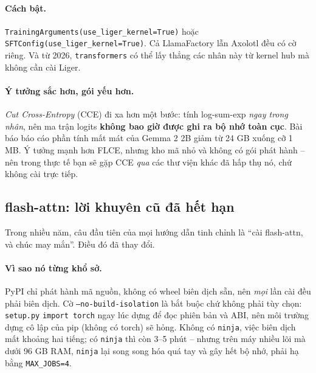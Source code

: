 \paragraph{Cách bật.} \texttt{Training\allowbreak Arguments(\allowbreak use\_\allowbreak liger\_\allowbreak kernel=True)} hoặc \texttt{SFTConfig(\allowbreak use\_\allowbreak liger\_\allowbreak kernel=True)}. Cả LlamaFactory lẫn Axolotl đều có cờ riêng. Và từ 2026, \texttt{transformers} có thể lấy thẳng các nhân này từ kernel hub mà không cần cài Liger.

\paragraph{Ý tưởng sắc hơn, gói yếu hơn.} \emph{Cut Cross-Entropy} (CCE) \cite{wijmans2025cce} đi xa hơn một bước: tính log-sum-exp \emph{ngay trong nhân}, nên ma trận logits \textbf{không bao giờ được ghi ra bộ nhớ toàn cục}. Bài báo báo cáo phần tính mất mát của Gemma 2 2B giảm từ 24 GB xuống cỡ 1 MB. Ý tưởng mạnh hơn FLCE, nhưng kho mã nhỏ và không có gói phát hành -- nên trong thực tế bạn sẽ gặp CCE \emph{qua} các thư viện khác đã hấp thụ nó, chứ không cài trực tiếp.

\subsection{flash-attn: lời khuyên cũ đã hết hạn}
\label{ssec:flashattn_install}

Trong nhiều năm, câu đầu tiên của mọi hướng dẫn tinh chỉnh là “cài flash-attn, và chúc may mắn”. Điều đó đã thay đổi.

\paragraph{Vì sao nó từng khổ sở.} PyPI chỉ phát hành mã nguồn, không có wheel biên dịch sẵn, nên \emph{mọi} lần cài đều phải biên dịch. Cờ \texttt{--no-\allowbreak build-\allowbreak isolation} là bắt buộc chứ không phải tùy chọn: \texttt{setup.py} \texttt{import torch} ngay lúc dựng để đọc phiên bản và ABI, nên môi trường dựng cô lập của pip (không có torch) sẽ hỏng. Không có \texttt{ninja}, việc biên dịch mất khoảng hai tiếng; có \texttt{ninja} thì còn 3--5 phút -- nhưng trên máy nhiều lõi mà dưới 96 GB RAM, \texttt{ninja} lại song song hóa quá tay và gây hết bộ nhớ, phải hạ bằng \texttt{MAX\_JOBS=4}.

